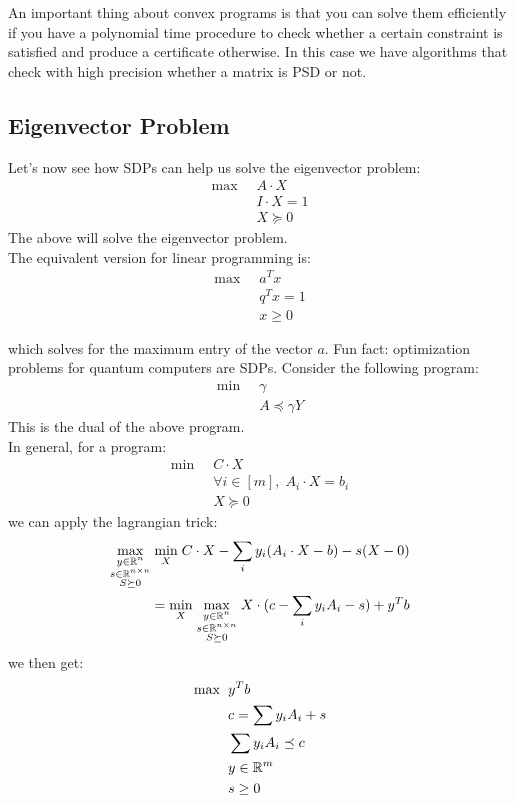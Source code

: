 \documentclass[11pt]{article}
\begin{document}
 An important thing about convex programs is that you can solve them efficiently if you have a polynomial time procedure to check whether a certain constraint is satisfied and produce a certificate otherwise. In this case we have algorithms that check with high precision whether a matrix is PSD or not.\\
 
 \subsection*{Eigenvector Problem}
 Let's now see how SDPs can help us solve the eigenvector problem:
 \begin{align*}
     \max \;&\; A \cdot X\\
     &\; I \cdot X = 1\\
     &\; X \succeq 0
 \end{align*}
 The above will solve the eigenvector problem.\\
 
 The equivalent version for linear programming is:
  \begin{align*}
     \max \;&\; a^Tx\\
     &\; q^Tx =1\\
     &\; x \geq 0
 \end{align*}
 
 which solves for the maximum entry of the vector $a$. Fun fact: optimization problems for quantum computers are SDPs. Consider the following program:
\begin{align*}
    \min \;&\; \gamma\\
    &\; A\preceq \gamma Y
\end{align*}
This is the dual of the above program.\\

In general, for a program:
\begin{align*}
    \min \;&\; C \cdot X\\
    &\; \forall i \in [m], \; A_i \cdot X = b_i\\
    &\; X \succeq 0
\end{align*}
we can apply the lagrangian trick:
\begin{align*}
    \underset{\substack{y \in \mathbb{R}^n \\ s \in \mathbb{R}^{n\times n}\\ S \succeq 0}}{\max} \;\underset{\substack{X}}{\min}\; C \cdot X  - \sum_i y_i(A_i\cdot X - b) - s(X - 0)\\
    = \underset{\substack{X}}{\min}\; \underset{\substack{y \in \mathbb{R}^n \\ s \in \mathbb{R}^{n\times n}\\ S \succeq 0}}{\max} \; X \cdot( c  - \sum_i y_i A_i  - s) + y^Tb
\end{align*}
we then get:
\begin{align*}
    \max \;&\; y^Tb\\
    &\; c = \sum y_i A_i +s\\
    &\; \sum y_i A_i \preceq c\\
    &\; y \in \mathbb{R}^m\\
    &\; s \geq 0
\end{align*}
\end{document}
